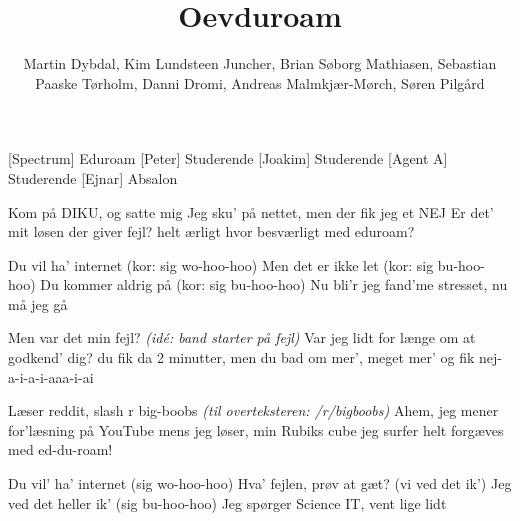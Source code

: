 \documentclass[a4paper,11pt]{article}
\title{Oevduroam}
\author{Martin Dybdal, Kim Lundsteen Juncher, Brian
  Søborg Mathiasen, Sebastian Paaske Tørholm, Danni Dromi, Andreas
  Malmkjær-Mørch, Søren Pilgård}
\begin{document}
 \maketitle

 \begin{roles}
   [Spectrum] Eduroam
   [Peter] Studerende
   [Joakim] Studerende
   [Agent A] Studerende
   [Ejnar] Absalon
 \end{roles}

 \begin{props}
 \end{props}

\begin{song}

%
  Kom på DIKU, og satte mig
  Jeg sku' på nettet, men der fik jeg et NEJ
  Er det' mit løsen der giver fejl?
  helt ærligt hvor besværligt med eduroam?


%
  Du vil ha' internet (kor: sig wo-hoo-hoo)
  Men det er ikke let (kor: sig bu-hoo-hoo)
  Du kommer aldrig på (kor: sig bu-hoo-hoo)
  Nu bli'r jeg fand'me stresset, nu må jeg gå


%
  Men var det min fejl? \textit{(idé: band starter på fejl)}
  Var jeg lidt for længe om at godkend' dig?
  du fik da 2 minutter, men du bad om mer', meget mer'
  og fik nej-a-i-a-i-aaa-i-ai

%
  Læser reddit, slash r big-boobs \textit{(til overteksteren: /r/bigboobs)}
  Ahem, jeg mener for'læsning på YouTube 
  mens jeg løser, min Rubiks cube
  jeg surfer helt forgæves med ed-du-roam!


%
  Du vil' ha' internet (sig wo-hoo-hoo)
  Hva' fejlen, prøv at gæt? (vi ved det ik')
  Jeg ved det heller ik' (sig bu-hoo-hoo)
  Jeg spørger Science IT, vent lige lidt



\end{song}
\end{document}
